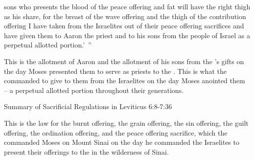 {sons
who presents
the blood
of the peace offering
and fat
will
have the right
thigh
as his share,
for
the
breast
of the wave offering
and the thigh
of the contribution
offering I have taken
from the Israelites
out of their peace offering
sacrifices
and have given
them to Aaron
the priest
and to his sons
from the people of
Israel
as a perpetual
allotted portion.’ ”
\par }{\PP {}This
is the allotment
of Aaron
and the allotment
of his sons
from the
{}’s
gifts
on the day
Moses presented
them
to serve
as priests to the
{}.
This
is what
the {}
commanded
to give
to them from the Israelites
on the day
Moses anointed them – a perpetual allotted portion throughout their generations.
\par }{\SH Summary of Sacrificial Regulations in Leviticus 6:8-7:36
\par }{\PP {}This
is the law
for the burnt offering,
the grain offering,
the sin offering,
the guilt offering,
the ordination
offering, and the peace offering
sacrifice,
which
the {}
commanded
Moses
on Mount
Sinai
on the day
he commanded
the
Israelites
to present
their offerings
to the
{}
in the wilderness
of Sinai.

}
